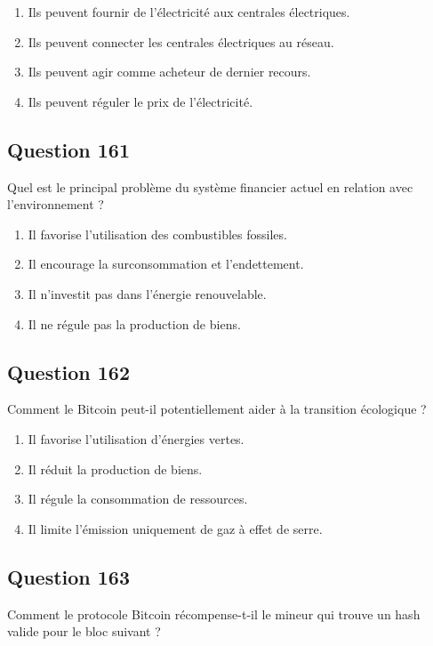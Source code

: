 \documentclass[12pt,a4paper]{article}
\begin{document}
\begin{enumerate}[label=\Alph*., leftmargin=*]
\item Ils peuvent fournir de l'électricité aux centrales électriques.
\item Ils peuvent connecter les centrales électriques au réseau.
\item Ils peuvent agir comme acheteur de dernier recours.
\item Ils peuvent réguler le prix de l'électricité.
\end{enumerate}

\bigskip


\subsection*{Question 161}
Quel est le principal problème du système financier actuel en relation avec l'environnement ?

\begin{enumerate}[label=\Alph*., leftmargin=*]
\item Il favorise l'utilisation des combustibles fossiles.
\item Il encourage la surconsommation et l'endettement.
\item Il n'investit pas dans l'énergie renouvelable.
\item Il ne régule pas la production de biens.
\end{enumerate}

\bigskip


\subsection*{Question 162}
Comment le Bitcoin peut-il potentiellement aider à la transition écologique ?

\begin{enumerate}[label=\Alph*., leftmargin=*]
\item Il favorise l'utilisation d'énergies vertes.
\item Il réduit la production de biens.
\item Il régule la consommation de ressources.
\item Il limite l'émission uniquement de gaz à effet de serre.
\end{enumerate}

\bigskip


\subsection*{Question 163}
Comment le protocole Bitcoin récompense-t-il le mineur qui trouve un hash valide pour le bloc suivant ?
\end{document}
